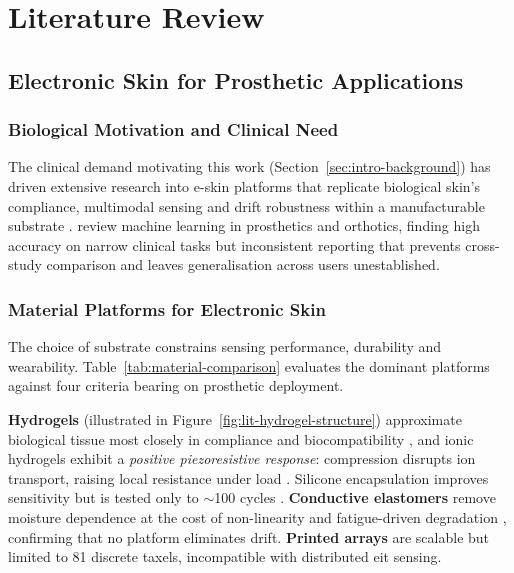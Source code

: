 \chapter{Literature Review}
\label{ch:literature_review}

\section{Electronic Skin for Prosthetic Applications}
\label{sec:lit-eskin}

\subsection{Biological Motivation and Clinical Need}
\label{sec:lit-eskin-bio}

The clinical demand motivating this work (Section~\ref{sec:intro-background}) has driven extensive research into e-skin platforms that replicate biological skin's compliance, multimodal sensing and drift robustness within a manufacturable substrate \parencite{chortos2016, hammock2013, shih2020}. \textcite{choo2023} review machine learning in prosthetics and orthotics, finding high accuracy on narrow clinical tasks but inconsistent reporting that prevents cross-study comparison and leaves generalisation across users unestablished.

\subsection{Material Platforms for Electronic Skin}
\label{sec:lit-eskin-materials}

The choice of substrate constrains sensing performance, durability and wearability. Table~\ref{tab:material-comparison} evaluates the dominant platforms against four criteria bearing on prosthetic deployment.

\textbf{Hydrogels} (illustrated in Figure~\ref{fig:lit-hydrogel-structure}) approximate biological tissue most closely in compliance and biocompatibility \parencite{park2022skin, tao2023}, and ionic hydrogels exhibit a \emph{positive piezoresistive response}: compression disrupts ion transport, raising local resistance under load \parencite{costacornella2023}. Silicone encapsulation improves sensitivity but is tested only to $\sim$100 cycles \parencite{dong2025lattice}. \textbf{Conductive elastomers} remove moisture dependence at the cost of non-linearity and fatigue-driven degradation \parencite{kim2024}, confirming that no platform eliminates drift. \textbf{Printed arrays} \parencite{yu2024} are scalable but limited to 81 discrete taxels, incompatible with distributed \gls{eit} sensing.

